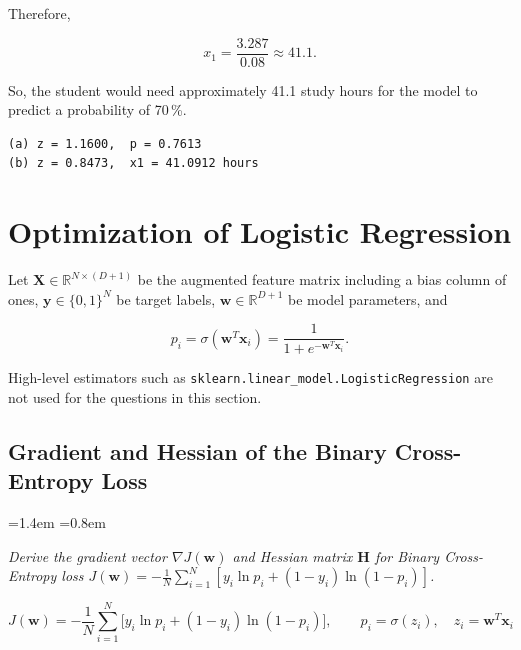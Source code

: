 \documentclass[12pt,a4paper]{article}
\newcommand{\qtext}[1]{%
  \begin{list}{}{\leftmargin=1.4em \rightmargin=0.8em
                 \topsep=3pt \parsep=0pt \itemsep=0pt}
  \item[]\itshape #1
  \end{list}}
\begin{document}
Therefore,

\begin{equation*}
x_1=\frac{3.287}{0.08}\approx41.1.
\end{equation*}

So, the student would need approximately 41.1 study hours for the model to predict a probability
of 70\,\%.



\begin{lstlisting}[style=plainout]
(a) z = 1.1600,  p = 0.7613
(b) z = 0.8473,  x1 = 41.0912 hours
\end{lstlisting}

\section{Optimization of Logistic Regression}

Let $\mathbf{X} \in \mathbb{R}^{N \times (D+1)}$ be the augmented feature matrix including a bias
column of ones, $\mathbf{y} \in \{0,1\}^N$ be target labels, $\mathbf{w} \in \mathbb{R}^{D+1}$ be
model parameters, and

\begin{equation}
p_i = \sigma(\mathbf{w}^T\mathbf{x}_i) = \frac{1}{1+e^{-\mathbf{w}^T\mathbf{x}_i}}.
\label{eq:pi}
\end{equation}

High-level estimators such as \texttt{sklearn.linear\_model.LogisticRegression} are not used for
the questions in this section.



\subsection{Gradient and Hessian of the Binary Cross-Entropy Loss}

\qtext{Derive the gradient vector $\nabla J(\mathbf{w})$ and Hessian matrix $\mathbf{H}$ for
Binary Cross-Entropy loss
$J(\mathbf{w}) = -\frac{1}{N}\sum_{i=1}^{N}[y_i \ln p_i + (1-y_i)\ln(1-p_i)]$.}

\begin{equation*}
J(\mathbf{w}) = -\frac{1}{N}\sum_{i=1}^{N}\big[y_i\ln p_i + (1-y_i)\ln(1-p_i)\big],
\qquad p_i = \sigma(z_i),\quad z_i = \mathbf{w}^{T}\mathbf{x}_i
\end{equation*}
\end{document}

